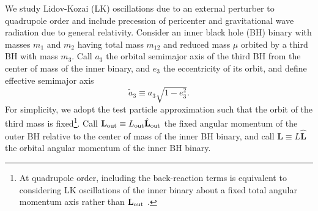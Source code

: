 \documentclass[
        twocolumn,
        twocolappendix
    ]{aastex63}
\renewcommand*{\bm}[1]{\boldsymbol{\mathbf{#1}}}
\newcommand*{\uv}[1]{\hat{\bm{#1}}}
\begin{document}
We study Lidov-Kozai (LK) oscillations due to an external perturber to
quadrupole order and include precession of pericenter and gravitational wave
radiation due to general relativity. Consider an inner black hole (BH) binary
with masses $m_1$ and $m_2$ having total mass $m_{12}$ and reduced mass $\mu$
orbited by a third BH with mass $m_3$. Call $a_3$ the orbital semimajor axis of
the third BH from the center of mass of the inner binary, and $e_3$ the
eccentricity of its orbit, and define effective semimajor axis
\begin{equation}
    \tilde{a}_3 \equiv a_3\sqrt{1 - e_3^2}.
\end{equation}
For simplicity, we adopt the test particle approximation such that the orbit of
the third mass is fixed\footnote{At quadrupole order, including the
back-reaction terms is equivalent to considering LK oscillations of the inner
binary about a fixed total angular momentum axis rather than $\bm{L}_{\rm out}$
\citep[see e.g.][]{bin1,bin2}.}. Call $\bm{L}_{\rm out} \equiv L_{\rm out}
\uv{L}_{\rm out}$ the fixed angular momentum of the outer BH relative to the
center of mass of the inner BH binary, and call $\bm{L} \equiv L \uv{L}$ the
orbital angular momentum of the inner BH binary.
\end{document}

